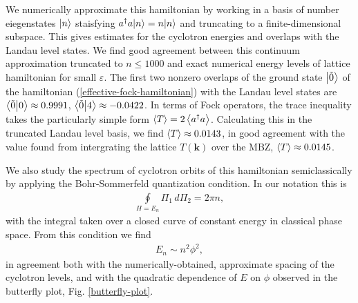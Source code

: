 \documentclass[aps,prb,twocolumn,letterpaper,twoside,nobalancelastpage,groupedaddress,amsmath,amssymb,floatfix,citeautoscript]{revtex4-1}
\begin{document}
We numerically approximate this hamiltonian by working in a basis of number eiegenstates $\ket{n}$ staisfying $a^{\dag}a{\ket{n}}=n{\ket{n}}$ and truncating to a finite-dimensional subspace. This gives estimates for the cyclotron energies and overlaps with the Landau level states. We find good agreement between this continuum approximation truncated to $n \leq 1000$ and exact numerical energy levels of lattice hamiltonian for small $\varepsilon$. The first two nonzero overlaps of the ground state $\ket{\tilde{0}}$ of the hamiltonian (\ref{effective-fock-hamiltonian}) with the Landau level states are $\braket{\tilde{0}}{0}\approx0.9991$, $\braket{\tilde{0}}{4}\approx-0.0422$. In terms of Fock operators, the trace inequality takes the particularly simple form $\expval{T} = 2\expval{a^{\dag}a}$\cite{bauer_quantum_2016}. Calculating this in the truncated Landau level basis, we find $\expval{T} \approx0.0143$, in good agreement with the value found from intergrating the lattice $T(\mathbf{k})$ over the MBZ, $\expval{T} \approx 0.0145$.

We also study the spectrum of cyclotron orbits of this hamiltonian semiclassically by applying the Bohr-Sommerfeld quantization condition. In our notation this is
\begin{align*}
\oint\limits_{H=E_n} \Pi_1\, d\Pi_2 = 2\pi n,
\end{align*}
with the integral taken over a closed curve of constant energy in classical phase space. From this condition we find
\begin{align*}
E_n \sim n^2\phi^2, 
\end{align*}
in agreement both with the numerically-obtained, approximate spacing of the cyclotron levels, and with the quadratic dependence of $E$ on $\phi$ observed in the butterfly plot, Fig. \ref{butterfly-plot}.

\end{document}
